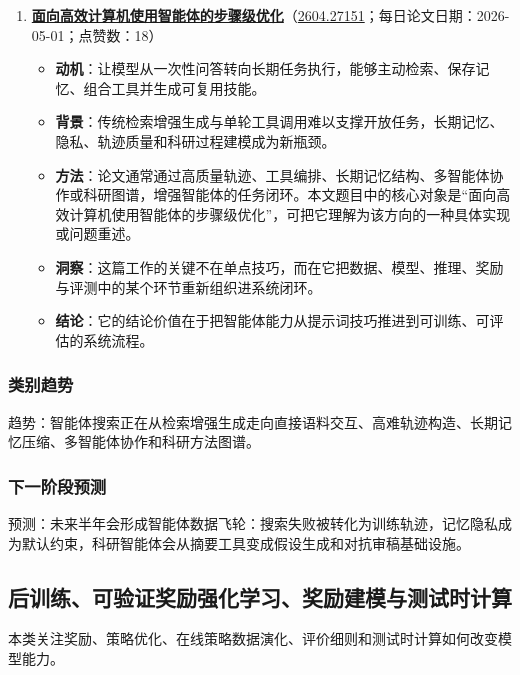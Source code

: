 \begin{enumerate}[leftmargin=1.5em]
\begin{itemize}[leftmargin=1.5em]
  \end{itemize}
  \item \textbf{\href{https://huggingface.co/papers/2604.27151}{面向高效计算机使用智能体的步骤级优化}}（\href{https://arxiv.org/abs/2604.27151}{2604.27151}；每日论文日期：2026-05-01；点赞数：18）
  \begin{itemize}[leftmargin=1.5em]
    \item \textbf{动机}：让模型从一次性问答转向长期任务执行，能够主动检索、保存记忆、组合工具并生成可复用技能。
    \item \textbf{背景}：传统检索增强生成与单轮工具调用难以支撑开放任务，长期记忆、隐私、轨迹质量和科研过程建模成为新瓶颈。
    \item \textbf{方法}：论文通常通过高质量轨迹、工具编排、长期记忆结构、多智能体协作或科研图谱，增强智能体的任务闭环。本文题目中的核心对象是“面向高效计算机使用智能体的步骤级优化”，可把它理解为该方向的一种具体实现或问题重述。
    \item \textbf{洞察}：这篇工作的关键不在单点技巧，而在它把数据、模型、推理、奖励与评测中的某个环节重新组织进系统闭环。
    \item \textbf{结论}：它的结论价值在于把智能体能力从提示词技巧推进到可训练、可评估的系统流程。
  \end{itemize}
\end{enumerate}

\subsubsection{类别趋势}
趋势：智能体搜索正在从检索增强生成走向直接语料交互、高难轨迹构造、长期记忆压缩、多智能体协作和科研方法图谱。

\subsubsection{下一阶段预测}
预测：未来半年会形成智能体数据飞轮：搜索失败被转化为训练轨迹，记忆隐私成为默认约束，科研智能体会从摘要工具变成假设生成和对抗审稿基础设施。

\subsection{后训练、可验证奖励强化学习、奖励建模与测试时计算}

本类关注奖励、策略优化、在线策略数据演化、评价细则和测试时计算如何改变模型能力。

